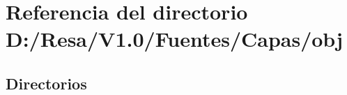 \section{Referencia del directorio D\+:/\+Resa/\+V1.0/\+Fuentes/\+Capas/obj}
\label{dir_cb8f37578be146f143ab54450f389db2}
\subsection*{Directorios}
\begin{DoxyCompactItemize}
\end{DoxyCompactItemize}

